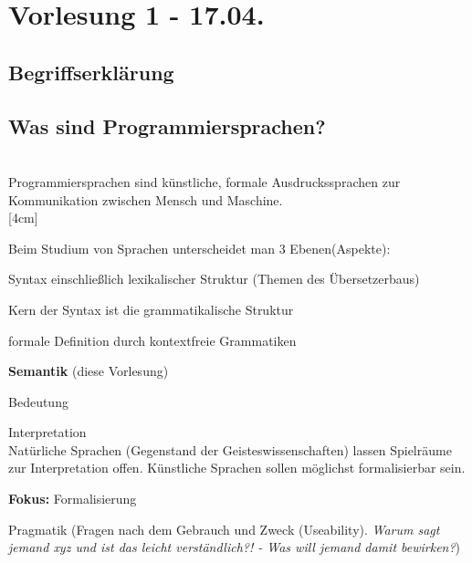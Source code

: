 \section{Vorlesung 1 - 17.04.}
\subsection{Begriffserklärung}
\subsection{Was sind Programmiersprachen?}\label{•}\\
Programmiersprachen sind künstliche, formale Ausdruckssprachen zur Kommunikation zwischen Mensch und Maschine.\\

[4cm]

Beim Studium von Sprachen unterscheidet man 3 Ebenen(Aspekte):
\begin{compactitem}
	\item Syntax einschließlich lexikalischer Struktur (Themen des Übersetzerbaus)\\
	\begin{compactitem}
		\item Kern der Syntax ist die grammatikalische Struktur\\
		\item formale Definition durch kontextfreie Grammatiken\\
	\end{compactitem}
	\item \textbf{Semantik} (diese Vorlesung)\\
	\begin{compactitem}
		\item Bedeutung\\
		\item Interpretation\\
		Natürliche Sprachen (Gegenstand der Geisteswissenschaften) lassen Spielräume zur Interpretation offen. Künstliche Sprachen sollen möglichst formalisierbar sein.
		\item \textbf{Fokus:} Formalisierung
	\end{compactitem}
	\item Pragmatik (Fragen nach dem Gebrauch und Zweck (Useability). \emph{Warum sagt jemand xyz und ist das leicht verständlich?! - Was will jemand damit bewirken?})
\end{compactitem}

